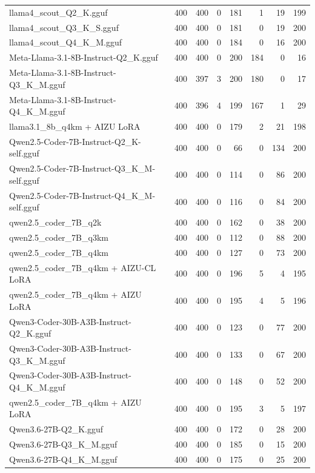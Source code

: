 \begin{table}[htbp]
{\begin{tabular}{lrrrrrrr}
    llama4\_scout\_Q2\_K.gguf & 400 & 400 & 0 & 181 & 1 & 19 & 199 \\
    llama4\_scout\_Q3\_K\_S.gguf & 400 & 400 & 0 & 181 & 0 & 19 & 200 \\
    llama4\_scout\_Q4\_K\_M.gguf & 400 & 400 & 0 & 184 & 0 & 16 & 200 \\
    Meta-Llama-3.1-8B-Instruct-Q2\_K.gguf & 400 & 400 & 0 & 200 & 184 & 0 & 16 \\
    Meta-Llama-3.1-8B-Instruct-Q3\_K\_M.gguf & 400 & 397 & 3 & 200 & 180 & 0 & 17 \\
    Meta-Llama-3.1-8B-Instruct-Q4\_K\_M.gguf & 400 & 396 & 4 & 199 & 167 & 1 & 29 \\
    llama3.1\_8b\_q4km + AIZU LoRA & 400 & 400 & 0 & 179 & 2 & 21 & 198 \\
    Qwen2.5-Coder-7B-Instruct-Q2\_K-self.gguf & 400 & 400 & 0 & 66 & 0 & 134 & 200 \\
    Qwen2.5-Coder-7B-Instruct-Q3\_K\_M-self.gguf & 400 & 400 & 0 & 114 & 0 & 86 & 200 \\
    Qwen2.5-Coder-7B-Instruct-Q4\_K\_M-self.gguf & 400 & 400 & 0 & 116 & 0 & 84 & 200 \\
    qwen2.5\_coder\_7B\_q2k & 400 & 400 & 0 & 162 & 0 & 38 & 200 \\
    qwen2.5\_coder\_7B\_q3km & 400 & 400 & 0 & 112 & 0 & 88 & 200 \\
    qwen2.5\_coder\_7B\_q4km & 400 & 400 & 0 & 127 & 0 & 73 & 200 \\
    qwen2.5\_coder\_7B\_q4km + AIZU-CL LoRA & 400 & 400 & 0 & 196 & 5 & 4 & 195 \\
    qwen2.5\_coder\_7B\_q4km + AIZU LoRA & 400 & 400 & 0 & 195 & 4 & 5 & 196 \\
    Qwen3-Coder-30B-A3B-Instruct-Q2\_K.gguf & 400 & 400 & 0 & 123 & 0 & 77 & 200 \\
    Qwen3-Coder-30B-A3B-Instruct-Q3\_K\_M.gguf & 400 & 400 & 0 & 133 & 0 & 67 & 200 \\
    Qwen3-Coder-30B-A3B-Instruct-Q4\_K\_M.gguf & 400 & 400 & 0 & 148 & 0 & 52 & 200 \\
    qwen2.5\_coder\_7B\_q4km + AIZU LoRA & 400 & 400 & 0 & 195 & 3 & 5 & 197 \\
    Qwen3.6-27B-Q2\_K.gguf & 400 & 400 & 0 & 172 & 0 & 28 & 200 \\
    Qwen3.6-27B-Q3\_K\_M.gguf & 400 & 400 & 0 & 185 & 0 & 15 & 200 \\
    Qwen3.6-27B-Q4\_K\_M.gguf & 400 & 400 & 0 & 175 & 0 & 25 & 200 \\

\end{tabular}}
\end{table}
